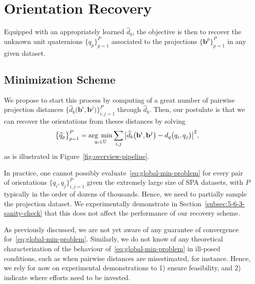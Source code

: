 \section{Orientation Recovery}
\label{sec:orientation-recovery}

Equipped with an appropriately learned $\widehat{d}_b$, the objective is then to recover the unknown unit quaternions $\big\{q_p\big\}_{p=1}^P$ associated to the projections $\big\{\mathbf{b}^p\big\}_{p=1}^P$ in any given dataset.

\subsection{Minimization Scheme}

We propose to start this process by computing of a great number of pairwise projection distances $\big\{\widehat{d}_b\big(\mathbf{b}^i,\mathbf{b}^j\big)\big\}_{i,j=1}^{P}$ through $\widehat{d}_b$. Then, our postulate is that we can recover the orientations from theses distances by solving
\begin{equation}
    \label{eq:global-min-problem}
    \big\{\widehat{q}_p\big\}_{p=1}^P=\underset{q_i\in\mathbb{U}}{\arg\;\min}\sum_{i,j} \big|\widehat{d}_b\big(\mathbf{b}^i,\mathbf{b}^j\big) - d_q\big(q_i,q_j\big) \big|^2,
\end{equation}
as is illustrated in Figure~\ref{fig:overview-pipeline}.

In practice, one cannot possibly evaluate~\eqref{eq:global-min-problem} for every pair of orientations $\big\{q_i,q_j\big\}_{i,j=1}^P$ given the extremely large size of SPA datasets, with $P$ typically in the order of dozens of thousands. Hence, we need to partially sample the projection dataset. We experimentally demonstrate in Section~\ref{subsec:5-6-3-sanity-check} that this does not affect the performance of our recovery scheme.

As previously discussed, we are not yet aware of any guarantee of convergence for~\eqref{eq:global-min-problem}. Similarly, we do not know of any theoretical characterization of the behaviour of~\eqref{eq:global-min-problem} in ill-posed conditions, such as when pairwise distances are misestimated, for instance. Hence, we rely for now on experimental demonstrations to 1) ensure feasibility, and 2) indicate where efforts need to be invested.

